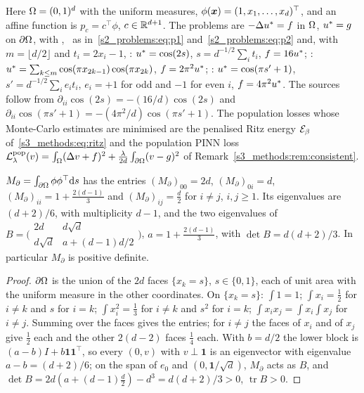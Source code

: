 Here $\Omega=(0,1)^d$ with the uniform measures, $\phi(\boldsymbol{x})=(1,x_1,\dots,x_d)^\top$, and an affine function
is $p_c=c^\top\phi$, $c\in\mathbb{R}^{d+1}$. The problems are $-\Delta u^{*}=f$ in $\Omega$, $u^{*}=g$ on $\partial\Omega$, with
\Pone, \Ptwo\ as in~\eqref{s2_problems:eq:p1} and~\eqref{s2_problems:eq:p2} and, with $m=\lfloor d/2\rfloor$
and $t_i=2x_i-1$,
\Pridge: $u^{*}=\cos(2s)$, $s=d^{-1/2}\sum_it_i$, $f=16u^{*}$;
\Pcospair: $u^{*}=\sum_{k\le m}\cos(\pi x_{2k-1})\cos(\pi x_{2k})$, $f=2\pi^2u^{*}$;
\Paltridge: $u^{*}=\cos(\pi s'+1)$, $s'=d^{-1/2}\sum_ie_it_i$, $e_i=+1$ for odd and $-1$ for even $i$,
$f=4\pi^2u^{*}$. The sources follow from $\partial_{ii}\cos(2s)=-(16/d)\cos(2s)$ and
$\partial_{ii}\cos(\pi s'+1)=-(4\pi^2/d)\cos(\pi s'+1)$.
The population losses whose Monte-Carlo estimates are minimised are the penalised Ritz energy
$\mathcal{E}_{\beta}$ of~\eqref{s3_methods:eq:ritz} and the population PINN loss
$\mathcal{L}^{\mathrm{pop}}_\lambda(v)=\int_\Omega(\Delta v+f)^2+\frac{\lambda}{2d}\int_{\partial\Omega}(v-g)^2$ of
Remark~\ref{s3_methods:rem:consistent}.

\begin{lemma}\label{sA_proofs:lem:gram}
$M_\partial=\int_{\partial\Omega}\phi\phi^\top\mathrm{d} s$ has the entries $(M_\partial)_{00}=2d$, $(M_\partial)_{0i}=d$,
$(M_\partial)_{ii}=1+\frac{2(d-1)}3$ and $(M_\partial)_{ij}=\frac d2$ for $i\ne j$, $i,j\ge1$. Its eigenvalues are
$(d+2)/6$, with multiplicity $d-1$, and the two eigenvalues of
$B=\bigl(\begin{smallmatrix}2d&d\sqrt d\\ d\sqrt d&a+(d-1)d/2\end{smallmatrix}\bigr)$,
$a=1+\frac{2(d-1)}3$, with $\det B=d(d+2)/3$. In particular $M_\partial$ is positive definite.
\end{lemma}
\begin{proof}
$\partial\Omega$ is the union of the $2d$ faces $\{x_k=s\}$, $s\in\{0,1\}$, each of unit area with the uniform
measure in the other coordinates. On $\{x_k=s\}$: $\int1=1$; $\int x_i=\frac12$ for $i\ne k$ and $s$
for $i=k$; $\int x_i^2=\frac13$ for $i\ne k$ and $s^2$ for $i=k$; $\int x_ix_j=\int x_i\int x_j$ for
$i\ne j$. Summing over the faces gives the entries; for $i\ne j$ the faces of $x_i$ and of $x_j$
give $\frac12$ each and the other $2(d-2)$ faces $\frac14$ each. With $b=d/2$ the lower block is
$(a-b)I+b\mathbf1\mathbf1^\top$, so every $(0,v)$ with $v\perp\mathbf1$ is an eigenvector with
eigenvalue $a-b=(d+2)/6$; on the span of $e_0$ and $(0,\mathbf1/\sqrt d)$, $M_\partial$ acts as $B$, and
$\det B=2d(a+(d-1)\frac d2)-d^3=d(d+2)/3>0$, $\operatorname{tr}B>0$.
\end{proof}

